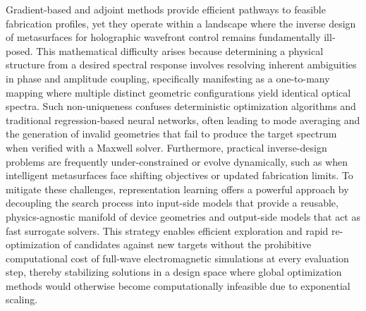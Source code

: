 Gradient-based and adjoint methods provide efficient pathways to feasible fabrication profiles, yet they operate within a landscape where the inverse design of metasurfaces for holographic wavefront control remains fundamentally ill-posed. This mathematical difficulty arises because determining a physical structure from a desired spectral response involves resolving inherent ambiguities in phase and amplitude coupling, specifically manifesting as a one-to-many mapping where multiple distinct geometric configurations yield identical optical spectra. Such non-uniqueness confuses deterministic optimization algorithms and traditional regression-based neural networks, often leading to mode averaging and the generation of invalid geometries that fail to produce the target spectrum when verified with a Maxwell solver. Furthermore, practical inverse-design problems are frequently under-constrained or evolve dynamically, such as when intelligent metasurfaces face shifting objectives or updated fabrication limits. To mitigate these challenges, representation learning offers a powerful approach by decoupling the search process into input-side models that provide a reusable, physics-agnostic manifold of device geometries and output-side models that act as fast surrogate solvers. \citep{doi_10_2139_ssrn_4082312_28ca582d} This strategy enables efficient exploration and rapid re-optimization of candidates against new targets without the prohibitive computational cost of full-wave electromagnetic simulations at every evaluation step, thereby stabilizing solutions in a design space where global optimization methods would otherwise become computationally infeasible due to exponential scaling. \citep{doi_10_71465_fapm546_bda368a5} \citep{doi_10_1002_adom_202502062_d73a85e1}

